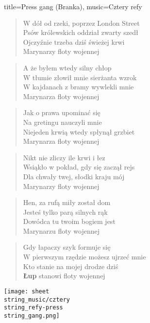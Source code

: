 \newpage
\begin{song}{title={Press gang (Branka)}, music={Cztery refy}}
\begin{multicols}{2}
    \begin{verse}
        W dół od rzeki, poprzez London Street \\
        Psów królewskich oddział zwarty szedł \\
        Ojczyźnie trzeba dziś świeżej krwi \\
        Marynarzy floty wojennej
    \end{verse}
    \begin{verse}
        A że byłem wtedy silny chłop\\
        W tłumie złowił mnie sierżanta wzrok \\
        W kajdanach z bramy wywlekli mnie \\
        Marynarza floty wojennej
    \end{verse}
    \begin{verse}
        Jak o prawa upominać się \\
        Na gretingu nauczyli mnie \\
        Niejeden krwią wtedy spłynął grzbiet \\
        Marynarza floty wojennej
    \end{verse}
    \begin{verse}
        Nikt nie zliczy ile krwi i łez \\
        Wsiąkło w pokład, gdy się zaczął rejs \\
        Dla chwały twej, słodki kraju mój \\
        Marynarzy floty wojennej
    \end{verse}
    \begin{verse}
        Hen, za rufą miły został dom \\
        Jesteś tylko parą silnych rąk \\
        Dowódca tu twoim bogiem jest \\
        Marynarzu floty wojennej
    \end{verse}
    \begin{verse}
        Gdy łapaczy szyk formuje się \\
        W pierwszym rzędzie możesz ujrzeć mnie \\
        Kto stanie na mojej drodze dziś \\
        \textbf{Łup} stanowi floty wojennej
    \end{verse}
\end{multicols}
    \texttt{[image: sheet\\string\_music/cztery\\string\_refy-press\\string\_gang.png]}
\end{song}
\newpage
